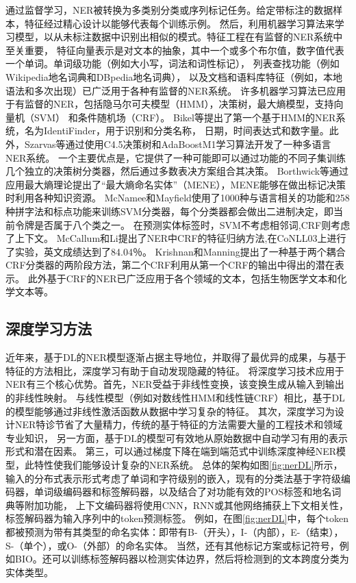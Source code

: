 通过监督学习，NER被转换为多类别分类或序列标记任务。给定带标注的数据样本，特征经过精心设计以能够代表每个训练示例。
然后，利用机器学习算法来学习模型，以从未标注数据中识别出相似的模式。特征工程在有监督的NER系统中至关重要，
特征向量表示是对文本的抽象，其中一个或多个布尔值，数字值代表一个单词。单词级功能（例如大小写，词法和词性标记），
列表查找功能（例如Wikipedia地名词典和DBpedia地名词典），
以及文档和语料库特征（例如，本地语法和多次出现）已广泛用于各种有监督的NER系统。
许多机器学习算法已应用于有监督的NER，包括隐马尔可夫模型（HMM），决策树，最大熵模型，支持向量机（SVM）
和条件随机场（CRF）。 Bikel等提出了第一个基于HMM的NER系统，名为IdentiFinder，用于识别和分类名称，
日期，时间表达式和数字量\cite{bikel1998nymble,bikel1999algorithm}。此外，Szarvas等通过使用C4.5决策树和AdaBoostM1学习算法开发了一种多语言NER系统。
一个主要优点是，它提供了一种可能即可以通过功能的不同子集训练几个独立的决策树分类器，然后通过多数表决方案组合其决策\cite{szarvas2006multilingual}。 
Borthwick等通过应用最大熵理论提出了“最大熵命名实体”（MENE），MENE能够在做出标记决策时利用各种知识资源。
 McNamee和Mayfield使用了1000种与语言相关的功能和258种拼字法和标点功能来训练SVM分类器，每个分类器都会做出二进制决定，即当前令牌是否属于八个类之一\cite{mcnamee2002entity}。
 在预测实体标签时，SVM不考虑相邻词,CRF则考虑了上下文。 
 McCallum和Li提出了NER中CRF的特征归纳方法,在CoNLL03上进行了实验，英文成绩达到了84.04％\cite{mccallum2003early}。 
 Krishnan和Manning提出了一种基于两个耦合CRF分类器的两阶段方法，第二个CRF利用从第一个CRF的输出中得出的潜在表示\cite{krishnan2006effective}。
 此外基于CRF的NER已广泛应用于各个领域的文本，包括生物医学文本和化学文本等。

 \subsection{深度学习方法}

 近年来，基于DL的NER模型逐渐占据主导地位，并取得了最优异的成果，与基于特征的方法相比，深度学习有助于自动发现隐藏的特征。 
 将深度学习技术应用于NER有三个核心优势。首先，NER受益于非线性变换，该变换生成从输入到输出的非线性映射。
 与线性模型（例如对数线性HMM和线性链CRF）相比，基于DL的模型能够通过非线性激活函数从数据中学习复杂的特征。
 其次，深度学习为设计NER特诊节省了大量精力，传统的基于特征的方法需要大量的工程技术和领域专业知识，
 另一方面，基于DL的模型可有效地从原始数据中自动学习有用的表示形式和潜在因素。
 第三，可以通过梯度下降在端到端范式中训练深度神经NER模型，此特性使我们能够设计复杂的NER系统。
 总体的架构如图\ref{fig:nerDL}所示，
 输入的分布式表示形式考虑了单词和字符级别的嵌入，现有的分类法基于字符级编码器，单词级编码器和标签解码器，以及结合了对功能有效的POS标签和地名词典等附加功能，
 上下文编码器将使用CNN，RNN或其他网络捕获上下文相关性，标签解码器为输入序列中的token预测标签。
 例如，在图\ref{fig:nerDL}中，每个token都被预测为带有其类型的命名实体：即带有B-（开头），I-（内部），E-（结束），S-（单个），或O-（外部）的命名实体。
 当然，还有其他标记方案或标记符号，例如BIO。还可以训练标签解码器以检测实体边界，然后将检测到的文本跨度分类为实体类型。


